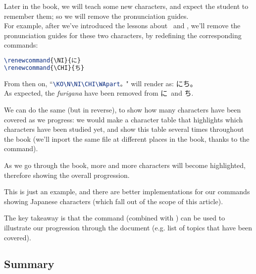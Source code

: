 Later in the book, we will teach some new characters, and expect the student to remember them; so we will remove the pronunciation guides. \\

For example, after we've introduced the lessons about \NI\ and \CHI, we'll remove the pronunciation guides for these two characters, by redefining the corresponding commands:
\begin{lstlisting}[language=tex]
\renewcommand{\NI}{に}
\renewcommand{\CHI}{ち}
\end{lstlisting}

\renewcommand{\NI}{に}
\renewcommand{\CHI}{ち}

From then on, ``\lstinline[language=tex]|\KO\N\NI\CHI\WApart。|" will render as: 
\KO\N\NI\CHI\WApart。 \\

As expected, the \emph{furigana} have been removed from \NI\ and \CHI.

\bigskip

We can do the same (but in reverse), to show how many characters have been covered as we progress: we would make a character table that highlights which characters have been studied yet, and show this table several times throughout the book (we'll inport the same file at different places in the book, thanks to the  command).

As we go through the book, more and more characters will become highlighted, therefore showing the overall progression. \\

\bigskip

This is just an example, and there are better implementations for our commands showing Japanese characters (which fall out of the scope of this article). \\


\begin{note}
The key takeaway is that the  command (combined with ) can be used to illustrate our progression through the document (e.g. list of topics that have been covered).
\end{note}


\newpage

\subsection{Summary}

